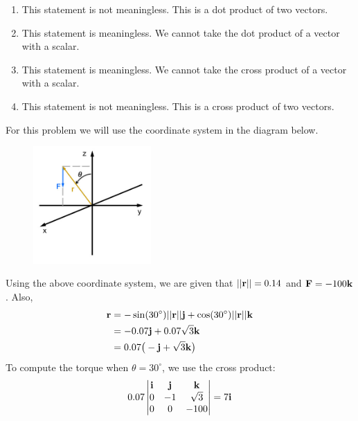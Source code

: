 \begin{enumerate}
\item This statement is not meaningless. This is a dot product of two vectors.
\item This statement is meaningless. We cannot take the dot product of a vector with a scalar. 
\item This statement is meaningless. We cannot take the cross product of a vector with a scalar. 
\item This statement is not meaningless. This is a cross product of two vectors.
\end{enumerate}
\item
For this problem we will use the coordinate system in the diagram below. 
\begin{figure}[!htbp]
  \begin{center}
    \includegraphics[width=0.4\textwidth]{ImgTorqueSol.jpg}
  \end{center}
\end{figure}
\BEN
\item Using the above coordinate system, we are given that $||\mathbf{r}|| = 0.14$ and $\mathbf{F} = -100\mathbf{k}$. Also, 
\begin{align*}
  \mathbf{r} &=- \sin(30^{\circ})||\mathbf{r}||\mathbf{j} + \cos(30^{\circ} )||\mathbf{r}||\mathbf{k}\\
  &= -0.07\mathbf{j} + 0.07\sqrt{3}\mathbf{k}\\
  &= 0.07\big(-\mathbf{j} + \sqrt{3}\mathbf{k}\big)
\end{align*}
To compute the torque when $\theta = 30^{\circ}$, we use the cross product:
\begin{align*}
0.07
\begin{vmatrix}
   \mathbf{i} & \mathbf{j} &  \mathbf{k} \\
   0 & -1 &  \sqrt{3} \\
   0 & 0 & -100  \\
  \end{vmatrix}=7\mathbf{i}
\end{align*} 
